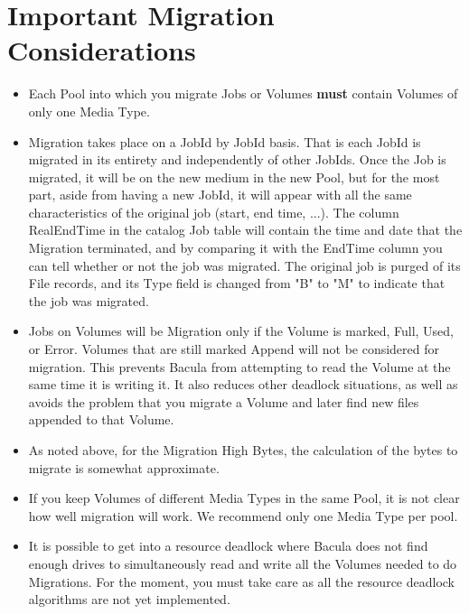 \section{Important Migration Considerations}
\begin{itemize}
\item Each Pool into which you migrate Jobs or Volumes {\bf must}
      contain Volumes of only one Media Type. 

\item Migration takes place on a JobId by JobId basis. That is
      each JobId is migrated in its entirety and independently
      of other JobIds. Once the Job is migrated, it will be
      on the new medium in the new Pool, but for the most part,
      aside from having a new JobId, it will appear with all the
      same characteristics of the original job (start, end time, ...).
      The column RealEndTime in the catalog Job table will contain the
      time and date that the Migration terminated, and by comparing
      it with the EndTime column you can tell whether or not the
      job was migrated.  The original job is purged of its File
      records, and its Type field is changed from "B" to "M" to
      indicate that the job was migrated.

\item Jobs on Volumes will be Migration only if the Volume is
      marked, Full, Used, or Error.  Volumes that are still 
      marked Append will not be considered for migration. This
      prevents Bacula from attempting to read the Volume at
      the same time it is writing it. It also reduces other deadlock
      situations, as well as avoids the problem that you migrate a
      Volume and later find new files appended to that Volume.

\item As noted above, for the Migration High Bytes, the calculation
      of the bytes to migrate is somewhat approximate.

\item If you keep Volumes of different Media Types in the same Pool,
      it is not clear how well migration will work.  We recommend only
      one Media Type per pool.

\item It is possible to get into a resource deadlock where Bacula does
      not find enough drives to simultaneously read and write all the
      Volumes needed to do Migrations. For the moment, you must take
      care as all the resource deadlock algorithms are not yet implemented.


\end{itemize}
